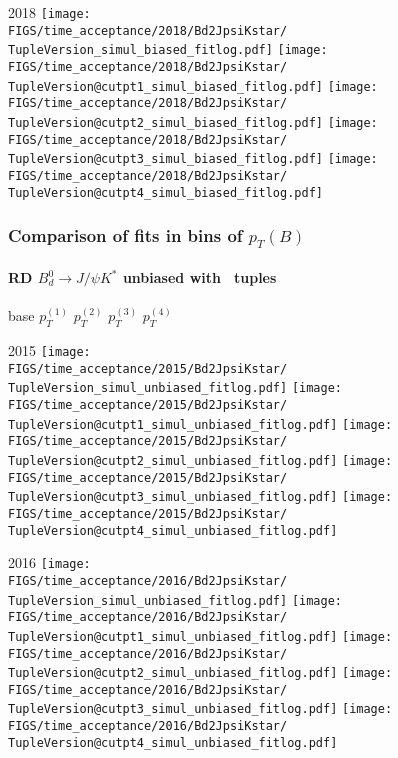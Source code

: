 \begin{frame}
  2018
  \texttt{[image: \\FIGS/time\_acceptance/2018/Bd2JpsiKstar/\\TupleVersion\_simul\_biased\_fitlog.pdf]}
  \texttt{[image: \\FIGS/time\_acceptance/2018/Bd2JpsiKstar/\\TupleVersion@cutpt1\_simul\_biased\_fitlog.pdf]}
  \texttt{[image: \\FIGS/time\_acceptance/2018/Bd2JpsiKstar/\\TupleVersion@cutpt2\_simul\_biased\_fitlog.pdf]}
  \texttt{[image: \\FIGS/time\_acceptance/2018/Bd2JpsiKstar/\\TupleVersion@cutpt3\_simul\_biased\_fitlog.pdf]}
  \texttt{[image: \\FIGS/time\_acceptance/2018/Bd2JpsiKstar/\\TupleVersion@cutpt4\_simul\_biased\_fitlog.pdf]}

\end{frame} %



\begin{frame} %
\frametitle{Comparison of fits in bins of $p_T(B)$}
\framesubtitle{RD $B_d^0\rightarrow J/\psi K^*$ unbiased with \TupleVersion\, tuples}

  \phantom{2020} base \hspace*{1.5cm} $p_T^{(1)}$ \hspace*{1.5cm} $p_T^{(2)}$ \hspace*{1.5cm} $p_T^{(3)}$ \hspace*{1.5cm} $p_T^{(4)}$

  2015
  \texttt{[image: \\FIGS/time\_acceptance/2015/Bd2JpsiKstar/\\TupleVersion\_simul\_unbiased\_fitlog.pdf]}
  \texttt{[image: \\FIGS/time\_acceptance/2015/Bd2JpsiKstar/\\TupleVersion@cutpt1\_simul\_unbiased\_fitlog.pdf]}
  \texttt{[image: \\FIGS/time\_acceptance/2015/Bd2JpsiKstar/\\TupleVersion@cutpt2\_simul\_unbiased\_fitlog.pdf]}
  \texttt{[image: \\FIGS/time\_acceptance/2015/Bd2JpsiKstar/\\TupleVersion@cutpt3\_simul\_unbiased\_fitlog.pdf]}
  \texttt{[image: \\FIGS/time\_acceptance/2015/Bd2JpsiKstar/\\TupleVersion@cutpt4\_simul\_unbiased\_fitlog.pdf]}
  \vspace*{2mm}

  2016
  \texttt{[image: \\FIGS/time\_acceptance/2016/Bd2JpsiKstar/\\TupleVersion\_simul\_unbiased\_fitlog.pdf]}
  \texttt{[image: \\FIGS/time\_acceptance/2016/Bd2JpsiKstar/\\TupleVersion@cutpt1\_simul\_unbiased\_fitlog.pdf]}
  \texttt{[image: \\FIGS/time\_acceptance/2016/Bd2JpsiKstar/\\TupleVersion@cutpt2\_simul\_unbiased\_fitlog.pdf]}
  \texttt{[image: \\FIGS/time\_acceptance/2016/Bd2JpsiKstar/\\TupleVersion@cutpt3\_simul\_unbiased\_fitlog.pdf]}
  \texttt{[image: \\FIGS/time\_acceptance/2016/Bd2JpsiKstar/\\TupleVersion@cutpt4\_simul\_unbiased\_fitlog.pdf]}
  \vspace*{2mm}


\end{frame}
